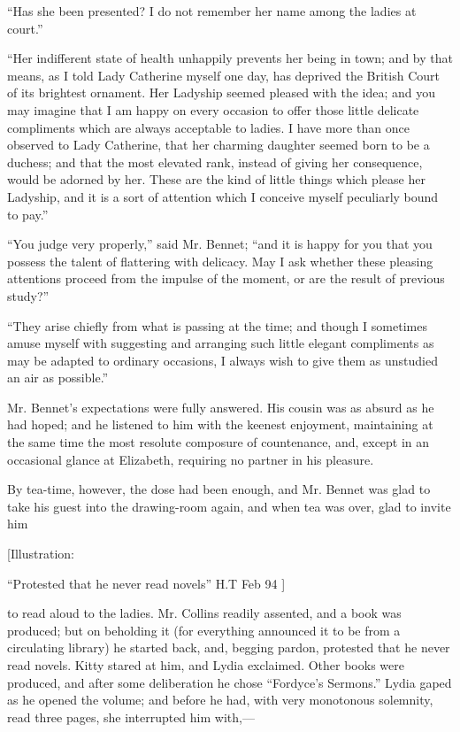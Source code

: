 \documentclass[12pt]{book}
\begin{document}
``Has she been presented? I do not remember her name among the ladies at court.''

``Her indifferent state of health unhappily prevents her being in town; and by that means, as I told Lady Catherine myself one day, has deprived the British Court of its brightest ornament. Her Ladyship seemed pleased with the idea; and you may imagine that I am happy on every occasion to offer those little delicate compliments which are always acceptable to ladies. I have more than once observed to Lady Catherine, that her charming daughter seemed born to be a duchess; and that the most elevated rank, instead of giving her consequence, would be adorned by her. These are the kind of little things which please her Ladyship, and it is a sort of attention which I conceive myself peculiarly bound to pay.''

``You judge very properly,'' said Mr. Bennet; ``and it is happy for you that you possess the talent of flattering with delicacy. May I ask whether these pleasing attentions proceed from the impulse of the moment, or are the result of previous study?''

``They arise chiefly from what is passing at the time; and though I sometimes amuse myself with suggesting and arranging such little elegant compliments as may be adapted to ordinary occasions, I always wish to give them as unstudied an air as possible.''

Mr. Bennet's expectations were fully answered. His cousin was as absurd as he had hoped; and he listened to him with the keenest enjoyment, maintaining at the same time the most resolute composure of countenance, and, except in an occasional glance at Elizabeth, requiring no partner in his pleasure.

By tea-time, however, the dose had been enough, and Mr. Bennet was glad to take his guest into the drawing-room again, and when tea was over, glad to invite him

[Illustration:

``Protested that he never read novels'' H.T Feb 94 ]

to read aloud to the ladies. Mr. Collins readily assented, and a book was produced; but on beholding it (for everything announced it to be from a circulating library) he started back, and, begging pardon, protested that he never read novels. Kitty stared at him, and Lydia exclaimed. Other books were produced, and after some deliberation he chose ``Fordyce's Sermons.'' Lydia gaped as he opened the volume; and before he had, with very monotonous solemnity, read three pages, she interrupted him with,---
\end{document}
